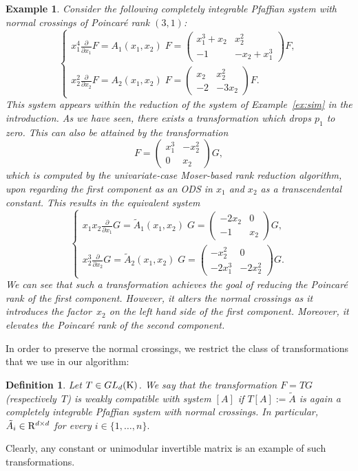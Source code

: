 \documentclass[final,1p,times,number,amsthm]{elsart}
\newtheorem{example}[lemma]{Example}
\newtheorem{definition}[lemma]{Definition}
\newcommand{\pder}[2]{\frac{\partial}{\partial #2}#1}
\begin{document}
\begin{example}\cite[Section 4]{key5}
\label{exmnaive}
Consider the following completely integrable Pfaffian system with normal
crossings of Poincar\'e rank $(3,1)$:
\begin{equation*}
\begin{cases}
  x_1^4 \pder{F}{x_1} = A_{1}(x_1, x_2)\; F = \left(\begin{matrix} x_1^3 +x_2 &
      x_2^2 \\ -1 & -x_2 + x_1^3 \end{matrix}\right)  F,\\
  x_2^2 \pder{F}{x_2} = A_{2}(x_1, x_2)\; F = \left(\begin{matrix} x_2 & x_2^2
      \\ -2 & -3x_2\end{matrix}\right) F.
\end{cases}
\end{equation*}
This system appears within the reduction of the system of Example~\ref{ex:sim}
in the introduction. As we have seen, there exists a transformation which
drops $p_1$ to zero. This can also be attained by the transformation
\[F = \left(\begin{matrix} x_1^3 & -x_2^2 \\ 0 & x_2 \end{matrix}\right) G,\]
which is computed by the univariate-case Moser-based rank reduction algorithm,
upon regarding the first component as an ODS in $x_1$ and $x_2$ as a
transcendental constant. This results in the equivalent system
\[
  \begin{cases}
    \label{gaugePfaffian}
    x_1x_2 \pder{G}{x_1} = \tilde{A}_{1} (x_1,x_2) \; G= \left(\begin{matrix} -2
        x_2 & 0 \\ -1 & x_2 \end{matrix}\right)  G,\\
    x_2^3 \pder{G}{x_2}= \tilde{A}_{2}(x_1,x_2) \; G = \left(\begin{matrix}
        -x_2^2 & 0 \\ -2 x_1^3 & -2 x_2^2 \end{matrix}\right) G.
\end{cases}
\]
We can see that such a transformation achieves the goal of reducing the
Poincar\'e rank of the first component. However, it alters the normal crossings
as it introduces the factor~$x_2$ on the left hand side of the first
component. Moreover, it elevates the Poincar\'e rank of the second component.
\end{example}
In order to preserve the normal crossings, we restrict the class of
transformations that we use in  our algorithm:
 \begin{definition}
\label{wcompatible}
Let $T\in GL_d({\rm K})$. We say that the transformation $F= TG$ (respectively~$T$) is \textit{weakly compatible} with system $[A]$ if $T[A] :=\tilde{A}$ is
again a completely integrable Pfaffian system with normal crossings. In
particular, $\tilde{A}_i \in {\rm R}^{d \times d}$ for every
$i \in \{1, \dots, n\}.$
\end{definition}
Clearly, any constant or unimodular invertible matrix is an example of such
transformations. 
\end{document}
